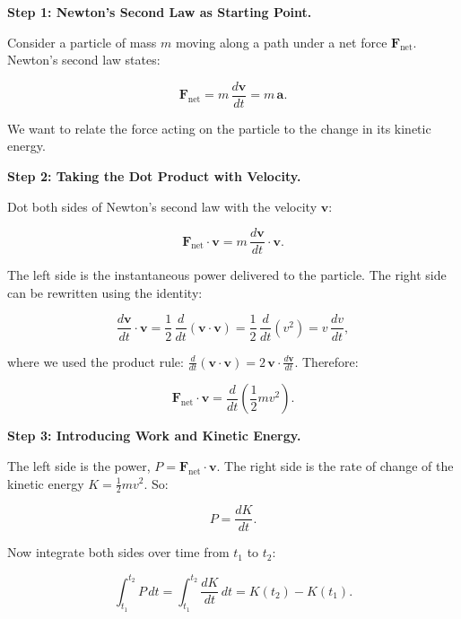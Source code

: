 \textbf{Step 1: Newton's Second Law as Starting Point.}

Consider a particle of mass $m$ moving along a path under a net force $\mathbf{F}_{\text{net}}$. Newton's second law states:

\begin{equation}
\mathbf{F}_{\text{net}} = m\,\frac{d\mathbf{v}}{dt} = m\,\mathbf{a}.
\end{equation}

We want to relate the force acting on the particle to the change in its kinetic energy.

\textbf{Step 2: Taking the Dot Product with Velocity.}

Dot both sides of Newton's second law with the velocity $\mathbf{v}$:

\begin{equation}
\mathbf{F}_{\text{net}}\cdot\mathbf{v} = m\,\frac{d\mathbf{v}}{dt}\cdot\mathbf{v}.
\end{equation}

The left side is the instantaneous power delivered to the particle. The right side can be rewritten using the identity:

\begin{equation}
\frac{d\mathbf{v}}{dt}\cdot\mathbf{v} = \frac{1}{2}\,\frac{d}{dt}(\mathbf{v}\cdot\mathbf{v}) = \frac{1}{2}\,\frac{d}{dt}(v^2) = v\,\frac{dv}{dt},
\end{equation}

where we used the product rule: $\frac{d}{dt}(\mathbf{v}\cdot\mathbf{v}) = 2\,\mathbf{v}\cdot\frac{d\mathbf{v}}{dt}$. Therefore:

\begin{equation}
\mathbf{F}_{\text{net}}\cdot\mathbf{v} = \frac{d}{dt}\!\left(\frac{1}{2}mv^2\right).
\end{equation}

\textbf{Step 3: Introducing Work and Kinetic Energy.}

The left side is the power, $P = \mathbf{F}_{\text{net}}\cdot\mathbf{v}$. The right side is the rate of change of the kinetic energy $K = \frac{1}{2}mv^2$. So:

\begin{equation}
P = \frac{dK}{dt}.
\end{equation}

Now integrate both sides over time from $t_1$ to $t_2$:

\begin{equation}
\int_{t_1}^{t_2} P\,dt = \int_{t_1}^{t_2} \frac{dK}{dt}\,dt = K(t_2) - K(t_1).
\end{equation}

